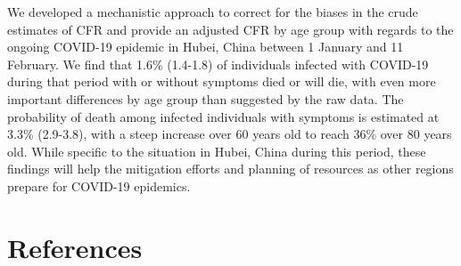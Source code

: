 \documentclass{article}
\begin{document}
We developed a mechanistic approach to correct for the biases in the crude estimates of CFR and provide an adjusted CFR by age group with regards to the ongoing COVID-19 epidemic in Hubei, China between 1 January and 11 February. We find that 1.6\% (1.4-1.8) of individuals infected with COVID-19 during that period with or without symptoms died or will die, with even more important differences by age group than suggested by the raw data. The probability of death among infected individuals with symptoms is estimated at 3.3\% (2.9-3.8), with a steep increase over 60 years old to reach 36\% over 80 years old. While specific to the situation in Hubei, China during this period, these findings will help the mitigation efforts and planning of resources as other regions prepare for COVID-19 epidemics. 




\section*{References}
\end{document}
